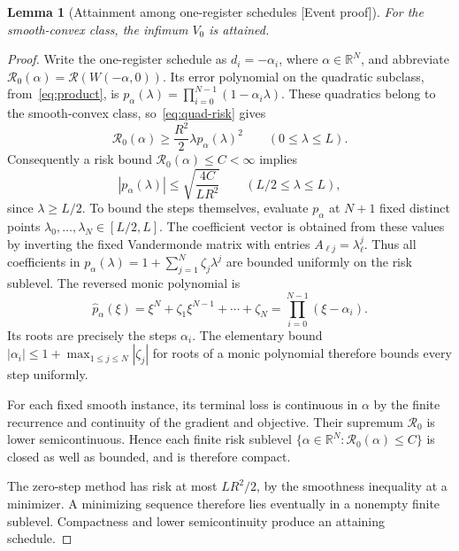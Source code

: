 \documentclass[11pt]{article}
\newcommand{\supportlabel}[1]{\textcolor{blue!60!black}{\small\textsf{[#1]}}}
\newcommand{\eventproof}{\supportlabel{Event proof}}
\numberwithin{equation}{section}
\newtheorem{lemma}[theorem]{Lemma}
\theoremstyle{definition}
\newcommand{\R}{\mathbb R}
\newcommand{\risk}{\mathcal R}
\begin{document}
\begin{lemma}[Attainment among one-register schedules \eventproof]\label{lem:compact}
For the smooth-convex class, the infimum $V_0$ is attained.
\end{lemma}
\begin{proof}
Write the one-register schedule as $d_i=-\alpha_i$, where $\alpha\in\R^N$, and abbreviate $\risk_0(\alpha)=\risk(W(-\alpha,0))$. Its error polynomial on the quadratic subclass, from~\eqref{eq:product}, is
$p_\alpha(\lambda)=\prod_{i=0}^{N-1}(1-\alpha_i\lambda)$.
These quadratics belong to the smooth-convex class, so~\eqref{eq:quad-risk} gives
\[
 \risk_0(\alpha)\ge\frac{R^2}{2}\lambda p_\alpha(\lambda)^2
 \qquad(0\le\lambda\le L).
\]
Consequently a risk bound $\risk_0(\alpha)\le C<\infty$ implies
\[
 |p_\alpha(\lambda)|\le\sqrt{\frac{4C}{LR^2}}
 \qquad(L/2\le\lambda\le L),
\]
since $\lambda\ge L/2$. To bound the steps themselves, evaluate $p_\alpha$ at $N+1$ fixed distinct points $\lambda_0,\ldots,\lambda_N\in[L/2,L]$. The coefficient vector is obtained from these values by inverting the fixed Vandermonde matrix with entries $A_{\ell j}=\lambda_\ell^j$. Thus all coefficients in $p_\alpha(\lambda)=1+\sum_{j=1}^N\zeta_j\lambda^j$ are bounded uniformly on the risk sublevel. The reversed monic polynomial is
\[
 \widehat p_\alpha(\xi)=\xi^N+\zeta_1\xi^{N-1}+\cdots+\zeta_N
 =\prod_{i=0}^{N-1}(\xi-\alpha_i).
\]
Its roots are precisely the steps $\alpha_i$. The elementary bound
$|\alpha_i|\le1+\max_{1\le j\le N}|\zeta_j|$ for roots of a monic polynomial therefore bounds every step uniformly.

For each fixed smooth instance, its terminal loss is continuous in $\alpha$ by the finite recurrence and continuity of the gradient and objective. Their supremum $\risk_0$ is lower semicontinuous. Hence each finite risk sublevel $\{\alpha\in\R^N:\risk_0(\alpha)\le C\}$ is closed as well as bounded, and is therefore compact.

The zero-step method has risk at most $LR^2/2$, by the smoothness inequality at a minimizer. A minimizing sequence therefore lies eventually in a nonempty finite sublevel. Compactness and lower semicontinuity produce an attaining schedule.
\end{proof}
\end{document}
